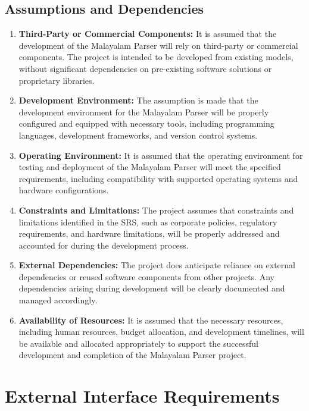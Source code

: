\documentclass[12pt]{article}
\begin{document}
	\subsection{Assumptions and Dependencies}
	\begin{enumerate}
		\item \textbf{Third-Party or Commercial Components:} It is assumed that the development of
		the Malayalam Parser will rely on third-party or commercial components.
		The project is intended to be developed from existing models, without significant
		dependencies on pre-existing software solutions or proprietary libraries.
		\item \textbf{Development Environment:} The assumption is made that the development
		environment for the Malayalam Parser will be properly configured and equipped
		with necessary tools, including programming languages, development frameworks,
		and version control systems.
		\item \textbf{Operating Environment:} It is assumed that the operating environment for testing
		and deployment of the Malayalam Parser will meet the specified requirements,
		including
		compatibility
		with
		supported
		operating
		systems
		and
		hardware
		configurations.
		\item \textbf{Constraints and Limitations:} The project assumes that constraints and limitations
		identified in the SRS, such as corporate policies, regulatory requirements, and
		hardware limitations, will be properly addressed and accounted for during the
		development process.
		\item \textbf{External Dependencies:} The project does anticipate reliance on external
		dependencies or reused software components from other projects. Any
		dependencies arising during development will be clearly documented and
		managed accordingly.
		\item \textbf{Availability of Resources:} It is assumed that the necessary resources, including
		human resources, budget allocation, and development timelines, will be available
		and allocated appropriately to support the successful development and completion
		of the Malayalam Parser project.
	\end{enumerate}
	
	\section{External Interface Requirements}
	
\end{document}
